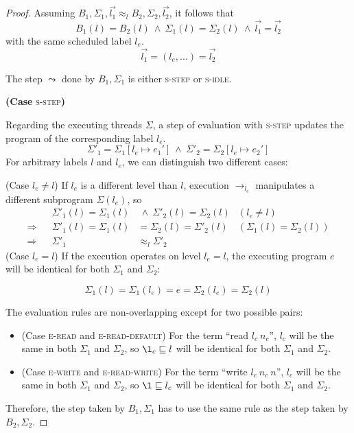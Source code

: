 \documentclass[10pt,preprint]{sigplanconf}
\begin{document}
\begin{proof}
  Assuming $B_1,\Sigma_1, \vec{l_1} \approx_l B_2,\Sigma_2, \vec{l_2}$, it follows that
  \[ B_1(l) = B_2(l)~\wedge~\Sigma_1(l) = \Sigma_2(l) ~\wedge~ \vec{l_1} = \vec{l_2}\]
  with the same scheduled label $l_e$.
  \[ \vec{l_1} = (l_e, ...) = \vec{l_2} \]

  \noindent The step $\leadsto$ done by $B_1,\Sigma_1$ is either \textsc{s-step} or \textsc{s-idle}.

  \textbf{(Case} \textsc{s-step}\textbf{)}

  Regarding the executing threads $\Sigma$, a step of evaluation with \textsc{s-step} updates the program of the corresponding label $l_e$.
\[ \Sigma'_1 = \Sigma_1[l_e \mapsto e_1'] ~\wedge~\Sigma'_2 = \Sigma_2[l_e \mapsto e_2'] \]
  For arbitrary labels $l$ and $l_e$, we can distinguish two different cases:

  (Case $l_e \not = l$) If $l_e$ is a different level than $l$, execution $\rightarrow_{l_e}$ manipulates a different subprogram $\Sigma(l_e)$, so
\begin{align*}
  && \Sigma'_1(l) = \Sigma_1(l)&~\wedge~\Sigma'_2(l) = \Sigma_2(l) & (l_e \not = l) \\
  \Rightarrow && \Sigma'_1(l) = \Sigma_1(l)& = \Sigma_2(l) = \Sigma'_2(l) & (\Sigma_1(l) = \Sigma_2(l)) \\
  \Rightarrow && \Sigma'_1 & \approx_l \Sigma'_2
\end{align*}
  (Case $l_e = l$) If the execution operates on level $l_e = l$, the executing program $e$ will be identical for both $\Sigma_1$ and $\Sigma_2$:

  \[ \Sigma_1(l) = \Sigma_1(l_e) = e = \Sigma_2(l_e) = \Sigma_2(l) \]

  The evaluation rules are non-overlapping except for two possible pairs:

  \begin{itemize}
\item (Case \textsc{e-read} and \textsc{e-read-default}) For the term ``read $l_c~n_c$'', $l_c$ will be the same in both $\Sigma_1$ and $\Sigma_2$, so $\l_c \sqsubseteq l$ will be identical for both $\Sigma_1$ and $\Sigma_2$.
\item (Case \textsc{e-write} and \textsc{e-read-write}) For the term ``write $l_c~n_c~n$'', $l_c$ will be the same in both $\Sigma_1$ and $\Sigma_2$, so $\l \sqsubseteq l_c$ will be identical for both $\Sigma_1$ and $\Sigma_2$.

  \end{itemize}
  Therefore, the step taken by $B_1, \Sigma_1$ has to use the same rule as the step taken by $B_2, \Sigma_2$.




\end{proof}
\end{document}

